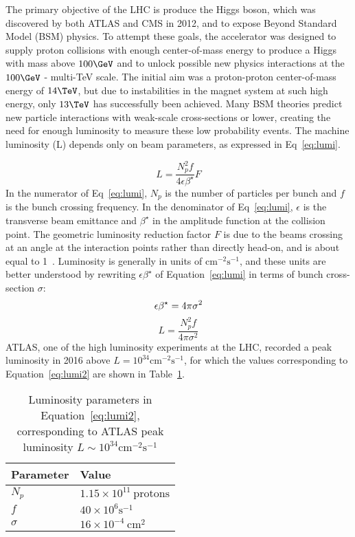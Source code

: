 The primary objective of the LHC is produce the Higgs boson, which was discovered by both ATLAS and CMS in 2012, and to expose Beyond Standard Model (BSM) physics.  To attempt these goals, the accelerator was designed to supply proton collisions with enough center-of-mass energy to produce a Higgs with mass above $100\GeV$ and to unlock possible new physics interactions at the $100\GeV$ - multi-TeV scale.  The initial aim was a proton-proton center-of-mass energy of $14 \TeV$, but due to instabilities in the magnet system at such high energy, only $13\TeV$ has successfully been achieved.  Many BSM theories predict new particle interactions with weak-scale cross-sections or lower, creating the need for enough luminosity to measure these low probability events.  The machine luminosity (L) depends only on beam parameters, as expressed in Eq~\ref{eq:lumi}.

\begin{equation}
L=\frac{N_p^2f}{4\epsilon\beta^{\star}}F
\label{eq:lumi}
\end{equation}
In the numerator of Eq~\ref{eq:lumi}, $N_p$ is the number of particles per bunch and $f$ is the bunch crossing frequency.  In the denominator of Eq~\ref{eq:lumi}, $\epsilon$ is the transverse beam emittance and $\beta^{\star}$ in the amplitude function at the collision point.  The geometric luminosity reduction factor $F$ is due to the beams crossing at an angle at the interaction points rather than directly head-on, and is about equal to 1~\cite{cid}.  Luminosity is generally in units of $\mathrm{cm}^{-2}\mathrm{s}^{-1}$, and these units are better understood by rewriting $\epsilon\beta^{\star}$ of Equation~\ref{eq:lumi} in terms of bunch cross-section $\sigma$:
\begin{equation}
\epsilon\beta^{\star}=4\pi\sigma^2\\
\label{eq:eb}
\end{equation} 
\begin{equation}
L=\frac{N_p^2f}{4\pi\sigma^2}
\label{eq:lumi2}
\end{equation} 
 ATLAS, one of the high luminosity experiments at the LHC, recorded a peak luminosity in 2016 above $L=10^{34}\mathrm{cm}^{-2}\mathrm{s}^{-1}$, for which the values corresponding to Equation~\ref{eq:lumi2} are shown in Table~\ref{tab:lumi}.
\begin{table}[!htp]
\centering
\small
\begin{tabular}{ll}
Parameter  & Value  \\
\hline \hline
$N_p$ & $1.15\times 10^{11}~\mathrm{protons}$ \\ 
$f$ & $40\times10^{6}\mathrm{s}^{-1}$ \\  
$\sigma$& $16\times10^{-4}~\mathrm{cm}^2$   \\
\hline 
\end{tabular}
\caption{Luminosity parameters in Equation~\ref{eq:lumi2}, corresponding to ATLAS peak luminosity $L\sim10^{34}\mathrm{cm}^{-2}\mathrm{s}^{-1}$}
\label{tab:lumi}
\end{table} 

